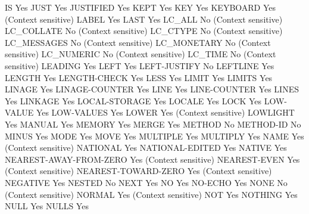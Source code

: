 IS                              Yes
JUST                            Yes
JUSTIFIED                       Yes
KEPT                            Yes
KEY                             Yes
KEYBOARD                        Yes (Context sensitive)
LABEL                           Yes
LAST                            Yes
LC_ALL                          No (Context sensitive)
LC_COLLATE                      No (Context sensitive)
LC_CTYPE                        No (Context sensitive)
LC_MESSAGES                     No (Context sensitive)
LC_MONETARY                     No (Context sensitive)
LC_NUMERIC                      No (Context sensitive)
LC_TIME                         No (Context sensitive)
LEADING                         Yes
LEFT                            Yes
LEFT-JUSTIFY                    No
LEFTLINE                        Yes
LENGTH                          Yes
LENGTH-CHECK                    Yes
LESS                            Yes
LIMIT                           Yes
LIMITS                          Yes
LINAGE                          Yes
LINAGE-COUNTER                  Yes
LINE                            Yes
LINE-COUNTER                    Yes
LINES                           Yes
LINKAGE                         Yes
LOCAL-STORAGE                   Yes
LOCALE                          Yes
LOCK                            Yes
LOW-VALUE                       Yes
LOW-VALUES                      Yes
LOWER                           Yes (Context sensitive)
LOWLIGHT                        Yes
MANUAL                          Yes
MEMORY                          Yes
MERGE                           Yes
METHOD                          No
METHOD-ID                       No
MINUS                           Yes
MODE                            Yes
MOVE                            Yes
MULTIPLE                        Yes
MULTIPLY                        Yes
NAME                            Yes (Context sensitive)
NATIONAL                        Yes
NATIONAL-EDITED                 Yes
NATIVE                          Yes
NEAREST-AWAY-FROM-ZERO          Yes (Context sensitive)
NEAREST-EVEN                    Yes (Context sensitive)
NEAREST-TOWARD-ZERO             Yes (Context sensitive)
NEGATIVE                        Yes
NESTED                          No
NEXT                            Yes
NO                              Yes
NO-ECHO                         Yes
NONE                            No (Context sensitive)
NORMAL                          Yes (Context sensitive)
NOT                             Yes
NOTHING                         Yes
NULL                            Yes
NULLS                           Yes
